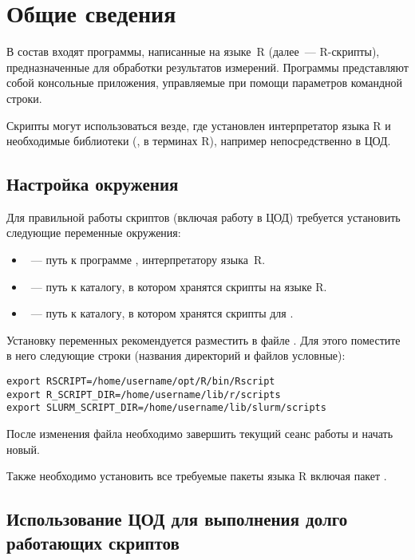 \section{Общие сведения}

В состав \GD{} входят программы, написанные на языке~R \cite{RLang} (далее~--- R-скрипты), предназначенные для обработки результатов измерений. Программы представляют собой консольные приложения, управляемые при помощи параметров командной строки.

Скрипты могут использоваться везде, где установлен интерпретатор языка R и необходимые библиотеки (,  в терминах R), например непосредственно в ЦОД.

\subsection{Настройка окружения}

Для правильной работы скриптов (включая работу в ЦОД) требуется установить следующие переменные окружения:

\begin{itemize}

\item {}~--- путь к программе , интерпретатору языка~R.

\item {}~--- путь к каталогу, в котором хранятся скрипты на языке R.

\item {}~--- путь к каталогу, в котором хранятся скрипты для .

\end{itemize}

Установку переменных рекомендуется разместить в файле . Для этого поместите в него следующие строки (названия директорий и файлов условные):

\begin{lstlisting}
export RSCRIPT=/home/username/opt/R/bin/Rscript
export R_SCRIPT_DIR=/home/username/lib/r/scripts
export SLURM_SCRIPT_DIR=/home/username/lib/slurm/scripts
\end{lstlisting}

После изменения файла необходимо завершить текущий сеанс работы и начать новый.

Также необходимо установить все требуемые пакеты языка R включая пакет .

\subsection{Использование ЦОД для выполнения долго работающих скриптов}

